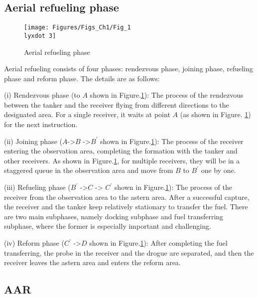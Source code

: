 \subsection{Aerial refueling phase}

\begin{figure}
\begin{centering}
\texttt{[image: Figures/Figs\_Ch1/Fig\_1\\lyxdot 3]}
\par\end{centering}
\caption{Aerial refueling phase}

\centering{}\label{Fig_1.3}
\end{figure}

Aerial refueling consists of four phases: rendezvous phase, joining
phase, refueling phase and reform phase. The details are as follows:

(i) Rendezvous phase (to $A$ shown in Figure.\ref{Fig_1.3}): The
process of the rendezvous between the tanker and the receiver flying
from different directions to the designated area. For a single receiver,
it waits at point $A$ (as shown in Figure. \ref{Fig_1.3}) for the
next instruction. 

(ii) Joining phase ($A$-\textgreater$B$ -\textgreater$B^{\prime}${}
shown in Figure.\ref{Fig_1.3}): The process of the receiver entering
the observation area, completing the formation with the tanker and
other receivers. As shown in Figure.\ref{Fig_1.3}, for multiple receivers,
they will be in a staggered queue in the observation area and move
from $B$ to $B^{\prime}$ one by one. 

(iii) Refueling phase ($B^{\prime}$ -\textgreater$C$ -\textgreater{}
$C^{\prime}$ shown in Figure.\ref{Fig_1.3}): The process of the
receiver from the observation area to the astern area. After a successful
capture, the receiver and the tanker keep relatively stationary to
transfer the fuel. There are two main subphases, namely docking subphase
and fuel transferring subphase, where the former is especially important
and challenging. 

(iv) Reform phase ($C^{\prime}$ -\textgreater$D${} shown in Figure.\ref{Fig_1.3}):
After completing the fuel transferring, the probe in the receiver
and the drogue are separated, and then the receiver leaves the astern
area and enters the reform area. 

\subsection{AAR}

